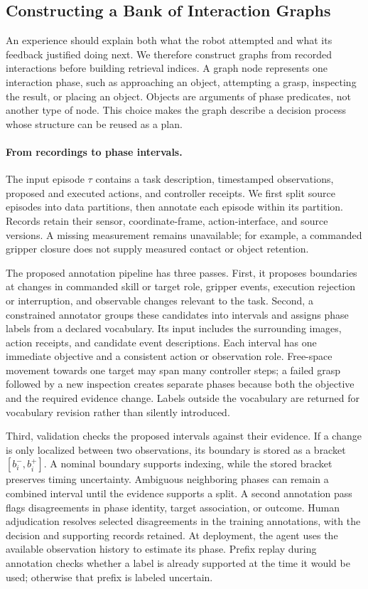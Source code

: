 \subsection{Constructing a Bank of Interaction Graphs}
\label{sec:construction}

An experience should explain both what the robot attempted and what its feedback justified doing next. We therefore construct graphs from recorded interactions before building retrieval indices. A graph node represents one interaction phase, such as approaching an object, attempting a grasp, inspecting the result, or placing an object. Objects are arguments of phase predicates, not another type of node. This choice makes the graph describe a decision process whose structure can be reused as a plan.

\paragraph{From recordings to phase intervals.}
The input episode $\tau$ contains a task description, timestamped observations, proposed and executed actions, and controller receipts. We first split source episodes into data partitions, then annotate each episode within its partition. Records retain their sensor, coordinate-frame, action-interface, and source versions. A missing measurement remains unavailable; for example, a commanded gripper closure does not supply measured contact or object retention.

The proposed annotation pipeline has three passes. First, it proposes boundaries at changes in commanded skill or target role, gripper events, execution rejection or interruption, and observable changes relevant to the task. Second, a constrained annotator groups these candidates into intervals and assigns phase labels from a declared vocabulary. Its input includes the surrounding images, action receipts, and candidate event descriptions. Each interval has one immediate objective and a consistent action or observation role. Free-space movement towards one target may span many controller steps; a failed grasp followed by a new inspection creates separate phases because both the objective and the required evidence change. Labels outside the vocabulary are returned for vocabulary revision rather than silently introduced.

Third, validation checks the proposed intervals against their evidence. If a change is only localized between two observations, its boundary is stored as a bracket $[b_i^{-},b_i^{+}]$. A nominal boundary supports indexing, while the stored bracket preserves timing uncertainty. Ambiguous neighboring phases can remain a combined interval until the evidence supports a split. A second annotation pass flags disagreements in phase identity, target association, or outcome. Human adjudication resolves selected disagreements in the training annotations, with the decision and supporting records retained. At deployment, the agent uses the available observation history to estimate its phase. Prefix replay during annotation checks whether a label is already supported at the time it would be used; otherwise that prefix is labeled uncertain.

